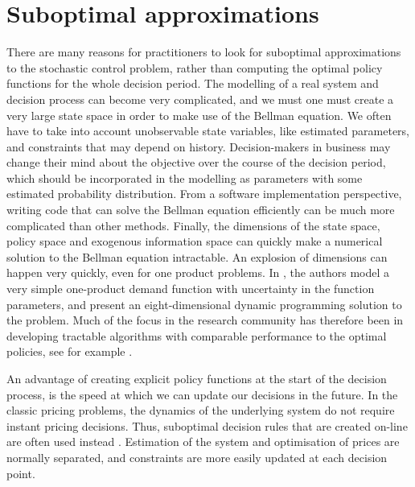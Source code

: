 \documentclass[main.tex]{subfiles}
\begin{document}
\listoftodos

\section{Suboptimal approximations}
There are many reasons for practitioners to look for suboptimal
approximations to the stochastic control problem, rather than
computing the optimal policy functions for the whole decision period.
The modelling of a real system and decision process can become very
complicated, and  we must one must create a very
large state space in order to make use of the Bellman equation.
We often have to take into account unobservable
state variables, like estimated parameters, and constraints that may
depend on history. Decision-makers in business may change their mind
about the objective over the course of the decision period, which should
be incorporated in the modelling as parameters with some estimated
probability distribution.
From a software implementation perspective, writing code that can
solve the Bellman equation efficiently can be much more complicated
than other methods.
Finally, the dimensions of the state space, policy space and exogenous
information space can quickly make a numerical solution to the Bellman
equation intractable. An explosion of dimensions can happen very
quickly, even for one product problems. In
\citep{bertsimas2001dynamic}, the authors model a very simple
one-product demand function with uncertainty in the function
parameters, and present an eight-dimensional dynamic programming
solution to the problem.
Much of the focus in the research community has therefore been in
developing tractable algorithms with comparable performance to the
optimal policies, see for example
\citep{powell2011approximate,bertsekas2012dynamic}.

An advantage of creating explicit policy functions at the start of the decision
process, is the speed at which we can update our decisions in the
future. In the classic pricing problems, the dynamics of the
underlying system do not require instant pricing decisions. Thus,
suboptimal decision rules that are created on-line are often used
instead \citep{talluri2006theory}. Estimation of the system and optimisation of prices are
normally separated, and constraints are more easily updated at each
decision point.
\end{document}
